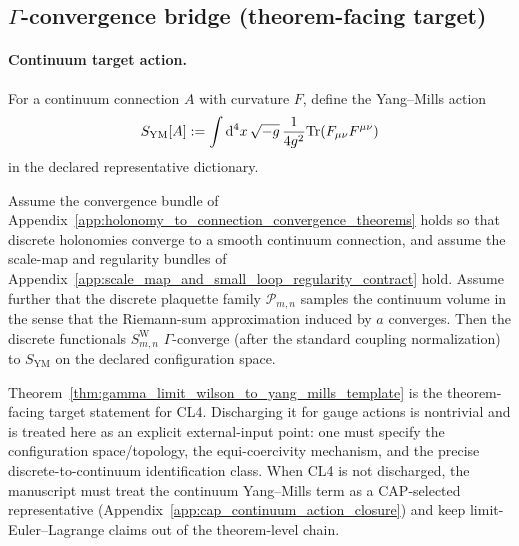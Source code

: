 \subsection{$\Gamma$-convergence bridge (theorem-facing target)}
\paragraph{Continuum target action.}
\MathTag For a continuum connection $A$ with curvature $F$, define the Yang--Mills action
\[
S_{\mathrm{YM}}[A]:=\int \mathrm{d}^4x\,\sqrt{-g}\,\frac{1}{4g^2}\mathrm{Tr}(F_{\mu\nu}F^{\mu\nu})
\]
in the declared representative dictionary.

\begin{theorem}
\label{thm:gamma_limit_wilson_to_yang_mills_template}
\MathTag Assume the convergence bundle of Appendix~\ref{app:holonomy_to_connection_convergence_theorems} holds so that discrete holonomies converge to a smooth continuum connection, and assume the scale-map and regularity bundles of Appendix~\ref{app:scale_map_and_small_loop_regularity_contract} hold.
Assume further that the discrete plaquette family $\mathcal{P}_{m,n}$ samples the continuum volume in the sense that the Riemann-sum approximation induced by $a$ converges.
Then the discrete functionals $S_{m,n}^{\mathrm{W}}$ $\Gamma$-converge (after the standard coupling normalization) to $S_{\mathrm{YM}}$ on the declared configuration space.
\end{theorem}

\AuditTag Theorem~\ref{thm:gamma_limit_wilson_to_yang_mills_template} is the theorem-facing target statement for CL4.
Discharging it for gauge actions is nontrivial and is treated here as an explicit external-input point: one must specify the configuration space/topology, the equi-coercivity mechanism, and the precise discrete-to-continuum identification class.
When CL4 is not discharged, the manuscript must treat the continuum Yang--Mills term as a CAP-selected representative (Appendix~\ref{app:cap_continuum_action_closure}) and keep limit-Euler--Lagrange claims out of the theorem-level chain.


